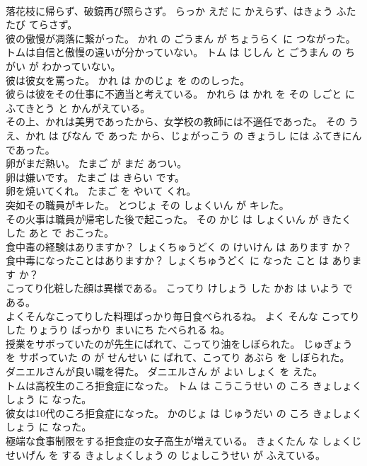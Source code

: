 \documentclass[8pt]{extreport}
\begin{document}
\begin{CJK}{UTF8}{min}
\\	落花枝に帰らず、破鏡再び照らさず。	らっか えだ に かえらず、はきょう ふたたび てらさず。	
\\	彼の傲慢が凋落に繋がった。	かれ の ごうまん が ちょうらく に つながった。	
\\	トムは自信と傲慢の違いが分かっていない。	トム は じしん と ごうまん の ちがい が わかっていない。	
\\	彼は彼女を罵った。	かれ は かのじょ を ののしった。	
\\	彼らは彼をその仕事に不適当と考えている。	かれら は かれ を その しごと に ふてきとう と かんがえている。	
\\	その上、かれは美男であったから、女学校の教師には不適任であった。	その うえ、かれ は びなん で あった から、じょがっこう の きょうし には ふてきにん であった。	
\\	卵がまだ熱い。	たまご が まだ あつい。	
\\	卵は嫌いです。	たまご は きらい です。	
\\	卵を焼いてくれ。	たまご を やいて くれ。	
\\	突如その職員がキレた。	とつじょ その しょくいん が キレた。	
\\	その火事は職員が帰宅した後で起こった。	その かじ は しょくいん が きたく した あと で おこった。	
\\	食中毒の経験はありますか？	しょくちゅうどく の けいけん は あります か？	
\\	食中毒になったことはありますか？	しょくちゅうどく に なった こと は あります か？	
\\	こってり化粧した顔は異様である。	こってり けしょう した かお は いよう で ある。	
\\	よくそんなこってりした料理ばっかり毎日食べられるね。	よく そんな こってり した りょうり ばっかり まいにち たべられる ね。	
\\	授業をサボっていたのが先生にばれて、こってり油をしぼられた。	じゅぎょう を サボっていた の が せんせい に ばれて、こってり あぶら を しぼられた。	
\\	ダニエルさんが良い職を得た。	ダニエルさん が よい しょく を えた。	
\\	トムは高校生のころ拒食症になった。	トム は こうこうせい の ころ きょしょくしょう に なった。	
\\	彼女は10代のころ拒食症になった。	かのじょ は じゅうだい の ころ きょしょくしょう に なった。	
\\	極端な食事制限をする拒食症の女子高生が増えている。	きょくたん な しょくじ せいげん を する きょしょくしょう の じょしこうせい が ふえている。	

\end{CJK}
\end{document}

